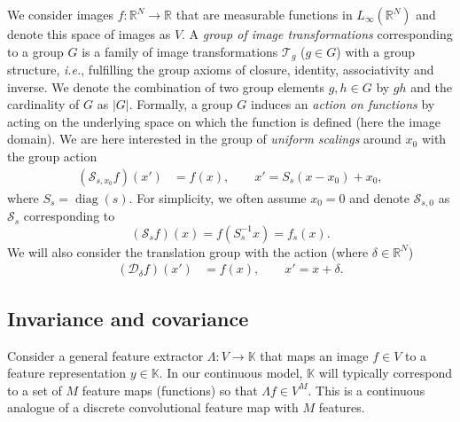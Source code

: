 \documentclass[twocolumn,runningheads]{svjour3}
\def\bbbr{{\mathbb R}}
\def\calD{\mathcal{D}}
\def\calT{\mathcal{T}}
\def\calS{\mathcal{S}}
\newcommand{\diag}{\operatorname{diag}}
\begin{document}
We consider images $f: \mathbb{R}^N \to \mathbb{R}$ that are measurable functions in $L_\infty(\bbbr^N)$ and denote this space of images as $V$. 
A \emph{group of image transformations} corresponding to a group $G$
is a family of image transformations $\calT_g$ ($g \in G$) with a
group structure, {\em i.e.\/}, fulfilling the group axioms of closure, identity, associativity and inverse.
We denote the combination of two group elements $g,h \in G$ by $gh$ and the cardinality of $G$ as $|G|$. 
Formally, a group $G$ induces an \emph{action on functions} by acting on the underlying space on which the function is defined (here the image domain). We are here  interested in the group of \emph{uniform scalings} around $x_0$ with the group action
\begin{align}
(\calS_{s, x_0} f ) (x') &= f(x), \quad\quad x' = S_s(x - x_0) + x_0 
\label{eq-scale-def},
\end{align}
where $S_s = \diag(s)$. For simplicity, we often assume $x_0=0$  and denote $\calS_{s,0}$ as $\calS_s$ corresponding to 
\begin{equation}
(\calS_s f)(x) = f(S_s^{-1} x) = f_s(x).
\label{eq-scale-def2}
\end{equation}
We will also consider the translation group with the action (where $\delta \in \bbbr^N$)
\begin{align}
(\calD_\delta f) (x') &= f(x), \quad\quad x' = x + \delta. \label{eq-trans-def}
\end{align}

\subsection{Invariance and covariance}

Consider a general feature extractor $\Lambda: V \to \mathbb{K}$ 
that maps an image $f \in V$ to a feature representation $y \in \mathbb{K}$. 
In our continuous model, $\mathbb{K}$ will typically correspond to a 
set of $M$  feature maps (functions) so that $\Lambda f \in V^M$.
This is a continuous analogue of a discrete convolutional feature map with $M$ features.
\end{document}
